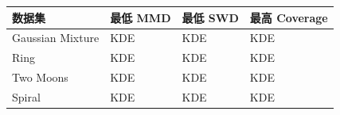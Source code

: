 \begin{tabular}{llll}
\toprule
数据集 & 最低 MMD & 最低 SWD & 最高 Coverage \\
\midrule
Gaussian Mixture & KDE & KDE & KDE \\
Ring & KDE & KDE & KDE \\
Two Moons & KDE & KDE & KDE \\
Spiral & KDE & KDE & KDE \\
\bottomrule
\end{tabular}